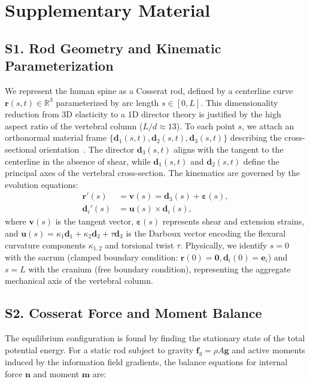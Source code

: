 \documentclass[11pt,a4paper]{article}
\begin{document}

\section*{Supplementary Material}

\subsection*{S1. Rod Geometry and Kinematic Parameterization}

We represent the human spine as a Cosserat rod, defined by a centerline curve $\mathbf{r}(s,t) \in \mathbb{R}^3$ parameterized by arc length $s \in [0, L]$. This dimensionality reduction from 3D elasticity to a 1D director theory is justified by the high aspect ratio of the vertebral column ($L/d \approx 13$). To each point $s$, we attach an orthonormal material frame $\{\mathbf{d}_1(s,t), \mathbf{d}_2(s,t), \mathbf{d}_3(s,t)\}$ describing the cross-sectional orientation~\cite{goriely2017mathematics, gazzola2018forward}. The director $\mathbf{d}_3(s,t)$ aligns with the tangent to the centerline in the absence of shear, while $\mathbf{d}_1(s,t)$ and $\mathbf{d}_2(s,t)$ define the principal axes of the vertebral cross-section. The kinematics are governed by the evolution equations:
\begin{align}
\mathbf{r}'(s) &= \mathbf{v}(s) = \mathbf{d}_3(s) + \boldsymbol{\varepsilon}(s), \\
\mathbf{d}_i'(s) &= \mathbf{u}(s) \times \mathbf{d}_i(s),
\label{eq:cosserat_kinematics}
\end{align}
where $\mathbf{v}(s)$ is the tangent vector, $\boldsymbol{\varepsilon}(s)$ represents shear and extension strains, and $\mathbf{u}(s) = \kappa_1 \mathbf{d}_1 + \kappa_2 \mathbf{d}_2 + \tau \mathbf{d}_3$ is the Darboux vector encoding the flexural curvature components $\kappa_{1,2}$ and torsional twist $\tau$. Physically, we identify $s=0$ with the sacrum (clamped boundary condition: $\mathbf{r}(0)=\mathbf{0}, \mathbf{d}_i(0)=\mathbf{e}_i$) and $s=L$ with the cranium (free boundary condition), representing the aggregate mechanical axis of the vertebral column.

\subsection*{S2. Cosserat Force and Moment Balance}

The equilibrium configuration is found by finding the stationary state of the total potential energy. For a static rod subject to gravity $\mathbf{f}_g = \rho A \mathbf{g}$ and active moments induced by the information field gradients, the balance equations for internal force $\mathbf{n}$ and moment $\mathbf{m}$ are:
\end{document}
